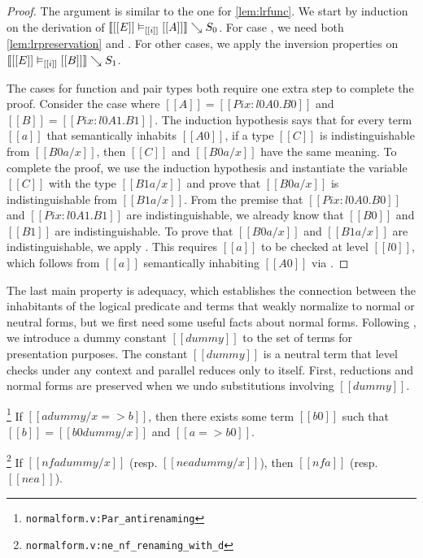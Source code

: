\documentclass[acmsmall, screen=true, nonacm=true,
  review=\ifpublic false\else true\fi,
  anonymous=\ifanonymous true\else false\fi
]{acmart}
\DeclarePairedDelimiter{\bracks}{\llbracket}{\rrbracket}
\newcommand{\suppl}[3]{{\scriptsize\texttt{#2:#3}}}
\newcommand{\interp}[4]{\bracks{#1 \vDash_{#2} #3} \searrow #4}
\newlength{\punctwidth}
\newcommand{\stack}[1]{%
  \settowidth{\punctwidth}{#1}%
  \hspace*{-\the\punctwidth}%
}
\begin{document}
\begin{proof}
  The argument is similar to the one for \cref{lem:lrfunc}.
  We start by induction on the derivation of
  $\interp{[[E]]}{[[i]]}{[[A]]}{S_0}$.
  For case , we need both \cref{lem:lrpreservation}
  and .
  For other cases, we apply the inversion properties on
  $\interp{[[E]]}{[[i]]}{[[B]]}{S_1}$.

  The cases for function and pair types both require one extra step to complete the
  proof. Consider the case where $[[A]] = [[Pi x : l0 A0 . B0]]$ and
  $[[B]] = [[Pi x : l0 A1 . B1]]$. The
  induction hypothesis says that for every term $[[a]]$ that
  semantically inhabits $[[A0]]$, if a type $[[C]]$ is
  indistinguishable from $[[B0 {a / x}]]$, then $[[C]]$ and $[[B0 {a /
  x}]]$ have the same meaning. To complete the proof, we use
  the induction hypothesis and instantiate the variable
  $[[C]]$ with the type $[[B1 { a / x}]]$ and prove that $[[B0 {a /
    x}]]$ is indistinguishable from $[[B1 {a / x}]]$.  From the
  premise that $[[Pi x : l0 A0 . B0]]$ and $[[Pi x : l0 A1 . B1]]$ are
  indistinguishable, we already know that $[[B0]]$ and $[[B1]]$ are
  indistinguishable.
  To prove that $[[B0 {a / x}]]$ and $[[B1 {a / x}]]$ are
  indistinguishable, we apply .
  This requires $[[a]]$ to be checked at level $[[l0]]$,
  which follows from $[[a]]$ semantically inhabiting $[[A0]]$ via .
\end{proof}

The last main property is adequacy,
which establishes the connection between the inhabitants of
the logical predicate and terms that weakly normalize to normal or
neutral forms, but we first need some
useful facts about normal forms. Following \citet{geuvers:cc-sn}, we
introduce a dummy constant $[[dummy]]$ to the set of
terms for presentation purposes. The constant $[[dummy]]$ is a neutral
term that level checks under any context and parallel reduces only to itself.
First, reductions and normal forms are preserved when we undo substitutions
involving $[[dummy]]$.

\begin{lemma}
  \stack{.~}\footnote{\suppl{theories}{normalform.v}{Par\_antirenaming}}
  \label{lem:paranti}
  If $[[a {dummy / x} => b]]$, then there exists some term $[[b0]]$
  such that $[[b]] = [[b0 {dummy / x}]]$ and $[[a => b0]]$.
\end{lemma}

\begin{lemma}
  \stack{.~}\footnote{\suppl{theories}{normalform.v}{ne\_nf\_renaming\_with\_d}}
  \label{lem:nfneanti}
  If $[[nf a {dummy / x}]]$ (resp. $[[ne a {dummy / x}]]$), then $[[nf
  a]]$ (resp. $[[ne a]]$).
\end{lemma}
\end{document}
